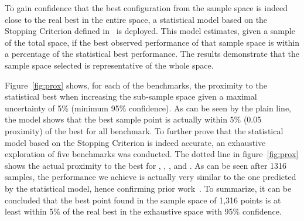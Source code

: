 To gain confidence that the best configuration from the sample space is indeed close to the real best in the entire space, a statistical model based on the Stopping Criterion defined in~\cite{vuduc2003AutomaticPerf} is deployed.
This model estimates, given a sample of the total space, if the best observed performance of that sample space is within a percentage of the statistical best performance.
The results demonstrate that the sample space selected is representative of the whole space.

Figure~\ref{fig:prox} shows, for each of the benchmarks, the proximity to the statistical best when increasing the sub-sample space given a maximal uncertainty of 5\%  (\ie minimum 95\% confidence).
As can be seen by the plain line, the model shows that the best sample point is actually within 5\% (0.05 proximity) of the best for all benchmark.
To further prove that the statistical model based on the Stopping Criterion is indeed accurate, an exhaustive exploration of five benchmarks was conducted.
The dotted line in figure~\ref{fig:prox} shows the actual proximity to the best for , , ,  and .
As can be seen after 1316 samples, the performance we achieve is actually very similar to the one predicted by the statistical model, hence confirming prior work~\cite{vuduc2003AutomaticPerf}.
To summarize, it can be concluded that the best point found in the sample space of 1,316 points is at least within 5\% of the real best in the exhaustive space with 95\% confidence.


